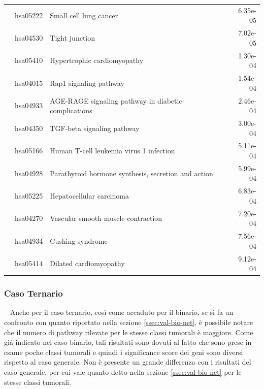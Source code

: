 \begin{longtable}{cllr}
 & hsa05222 & \textcolor{\clrnew}{Small cell lung cancer} & 6.35e-05 \\ 
 & hsa04530 & \textcolor{\clrnew}{Tight junction} & 7.02e-05 \\ 
 & hsa05410 & \textcolor{\clrnew}{Hypertrophic cardiomyopathy} & 1.30e-04 \\ 
 & hsa04015 & \textcolor{\clrnew}{Rap1 signaling pathway} & 1.54e-04 \\ 
 & hsa04933 & \textcolor{\clrnew}{AGE-RAGE signaling pathway in diabetic complications} & 2.46e-04 \\ 
 & hsa04350 & \textcolor{\clrnew}{TGF-beta signaling pathway} & 3.00e-04 \\ 
 & hsa05166 & \textcolor{\clrnew}{Human T-cell leukemia virus 1 infection} & 5.11e-04 \\ 
 & hsa04928 & \textcolor{\clrnew}{Parathyroid hormone synthesis, secretion and action} & 5.99e-04 \\ 
 & hsa05225 & \textcolor{\clrnew}{Hepatocellular carcinoma} & 6.83e-04 \\ 
 & hsa04270 & \textcolor{\clrnew}{Vascular smooth muscle contraction} & 7.20e-04 \\ 
 & hsa04934 & \textcolor{\clrnew}{Cushing syndrome} & 7.56e-04 \\ 
 & hsa05414 & \textcolor{\clrnew}{Dilated cardiomyopathy} & 9.12e-04 \\ 
\midrule 
\end{longtable} 

\subsubsection{Caso Ternario}~\newline
Anche per il caso ternario, così come accaduto per il binario, se si fa un confronto con quanto riportato nella sezione
\ref{ssec:val-bio-net}, è possibile notare che il numero di pathway rilevate per le stesse classi tumorali è maggiore.
Come già indicato nel caso binario, tali risultati sono dovuti al fatto che sono prese in esame poche classi tumorali
e quindi i significance score dei geni sono diversi rispetto al caso generale.
Non è presente un grande differenza con i risultati del caso generale, per cui vale quanto detto nella 
sezione \ref{ssec:val-bio-net} per le stesse classi tumorali.

